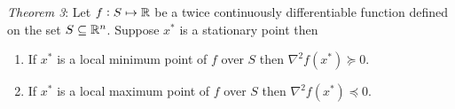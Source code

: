 \documentclass[12pt,a4paper]{article}
\begin{document}
		\textit{Theorem 3}: Let $f : S \mapsto \mathbb{R}$ be a twice continuously differentiable function defined on the set 
		$S \subseteq \mathbb{R}^n$. Suppose $x^*$ is a stationary point then
		\begin{enumerate}[i:]
			\item If $x^*$ is a local minimum point of $f$ over $S$ then $\nabla^2f(x^*) \succeq 0 $.
			\item If $x^*$ is a local maximum point of $f$ over $S$ then $\nabla^2f(x^*) \preceq 0 $.
		\end{enumerate} 
		
		
		
		
			
		
		
		
\end{document}
